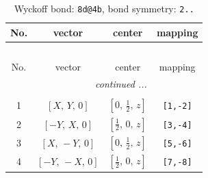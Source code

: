 \documentclass[fleqn,8pt]{jsarticle}
\begin{document}
\renewcommand{\arraystretch}{1.2}
\begin{longtable}{cccc}
\caption{Wyckoff bond: {\tt 8d@4b}, bond symmetry: {\tt 2..}}
 \\
 \hline \hline
No. & vector & center & mapping \\ \hline \endfirsthead

\multicolumn{3}{l}{\tablename\ \thetable{}} \\
 \hline \hline
No. & vector & center & mapping \\ \hline \endhead

 \hline \hline
\multicolumn{3}{r}{\footnotesize\it continued ...} \\ \endfoot

 \hline \hline
\multicolumn{3}{r}{} \\ \endlastfoot

1 & $\left[ X,\, Y,\, 0 \right]$ & $\left[ 0,\, \frac{1}{2},\, z \right]$ & {\tt [1,-2]} \\ \hline
2 & $\left[ - Y,\, X,\, 0 \right]$ & $\left[ \frac{1}{2},\, 0,\, z \right]$ & {\tt [3,-4]} \\ \hline
3 & $\left[ X,\, - Y,\, 0 \right]$ & $\left[ 0,\, \frac{1}{2},\, z \right]$ & {\tt [5,-6]} \\ \hline
4 & $\left[ - Y,\, - X,\, 0 \right]$ & $\left[ \frac{1}{2},\, 0,\, z \right]$ & {\tt [7,-8]} \\
\end{longtable}
\renewcommand{\arraystretch}{1.2}
\end{document}
